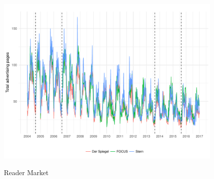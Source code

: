 \documentclass[12pt,a4paper,notitlepage]{article}
\begin{document}
\begin{figure}[H]
\caption{Reader Market}
\includegraphics{figs/ads_fss}
\label{fig_ads_fss1}
\end{figure}
\end{document}

